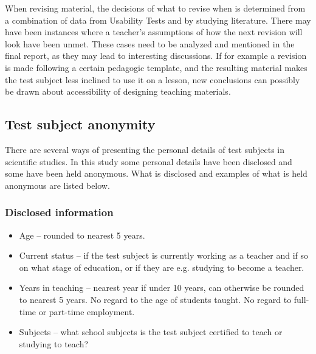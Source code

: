 When revising material, the decisions of what to revise when is determined from a combination of data from Usability Tests and by studying literature. There may have been instances where a teacher’s assumptions of how the next revision will look have been unmet. These cases need to be analyzed and mentioned in the final report, as they may lead to interesting discussions. If for example a revision is made following a certain pedagogic template, and the resulting material makes the test subject less inclined to use it on a lesson, new conclusions can possibly be drawn about accessibility of designing teaching materials.


\subsection{Test subject anonymity}
There are several ways of presenting the personal details of test subjects in scientific studies. In this study some personal details have been disclosed and some have been held anonymous. What is disclosed and examples of what is held anonymous are listed below.

\subsubsection*{Disclosed information}
    \begin{itemize} %
    \item Age – rounded to nearest 5 years.
    \item Current status – if the test subject is currently working as a teacher and if so on what stage of education, or if they are e.g. studying to become a teacher.
    \item Years in teaching – nearest year if under 10 years, can otherwise be rounded to nearest 5 years. No regard to the age of students taught. No regard to full-time or part-time employment.
    \item Subjects – what school subjects is the test subject certified to teach or studying to teach?
\end{itemize}

